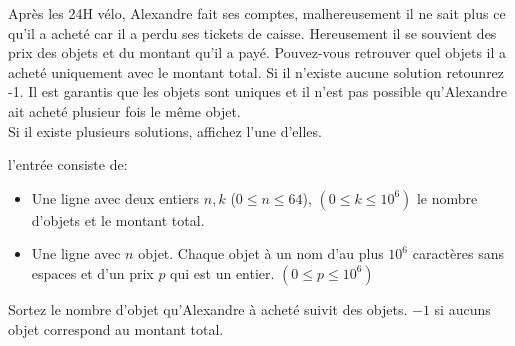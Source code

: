 \problemname{\problemyamlname}

\newcommand{\maxk}{10^6}
\newcommand{\maxn}{64}

Après les 24H vélo, Alexandre fait ses comptes, malhereusement il ne sait plus ce qu'il a acheté car il a perdu ses tickets de caisse. Hereusement il se souvient des prix des objets et du montant qu'il a payé. Pouvez-vous retrouver quel objets il a acheté uniquement avec le montant total. Si il n'existe aucune solution retounrez -1. Il est garantis que les objets sont uniques et il n'est pas possible qu'Alexandre ait acheté plusieur fois le même objet. \\
Si il existe plusieurs solutions, affichez l'une d'elles.


\begin{Input}
    l'entrée consiste de:
    \begin{itemize}
        \item Une ligne avec deux entiers $n, k$ ($0\leq n\leq \maxn$), $(0 \leq k \leq \maxk)$ le nombre d'objets et le montant total.
        \item Une ligne avec $n$ objet. Chaque objet à un nom d'au plus $10^6$ caractères sans espaces et d'un prix $p$ qui est un entier. $(0 \leq p \leq \maxk)$
    \end{itemize}
\end{Input}

\begin{Output}
    Sortez le nombre d'objet qu'Alexandre à acheté suivit des objets. $-1$ si aucuns objet correspond au montant total.
\end{Output}
